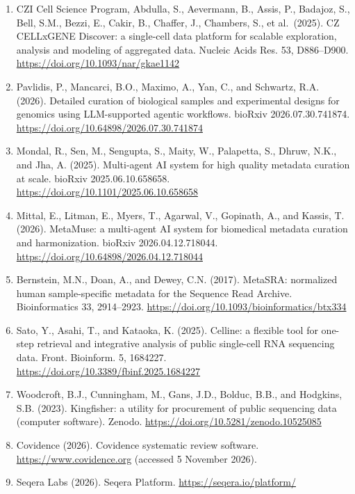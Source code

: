 \documentclass[11pt,a4paper]{article}
\begin{document}
\begin{enumerate}
  Model Context Protocol contributors (2026). The official Go SDK for
  Model Context Protocol servers and clients, version 1.8.0.
  \url{https://github.com/modelcontextprotocol/go-sdk} (accessed 6
  November 2026).
\item
  CZI Cell Science Program, Abdulla, S., Aevermann, B., Assis, P.,
  Badajoz, S., Bell, S.M., Bezzi, E., Cakir, B., Chaffer, J., Chambers,
  S., et al.~(2025). CZ CELLxGENE Discover: a single-cell data platform
  for scalable exploration, analysis and modeling of aggregated data.
  Nucleic Acids Res. 53, D886--D900.
  \url{https://doi.org/10.1093/nar/gkae1142}
\item
  Pavlidis, P., Mancarci, B.O., Maximo, A., Yan, C., and Schwartz, R.A.
  (2026). Detailed curation of biological samples and experimental
  designs for genomics using LLM-supported agentic workflows. bioRxiv
  2026.07.30.741874. \url{https://doi.org/10.64898/2026.07.30.741874}
\item
  Mondal, R., Sen, M., Sengupta, S., Maity, W., Palapetta, S., Dhruw,
  N.K., and Jha, A. (2025). Multi-agent AI system for high quality
  metadata curation at scale. bioRxiv 2025.06.10.658658.
  \url{https://doi.org/10.1101/2025.06.10.658658}
\item
  Mittal, E., Litman, E., Myers, T., Agarwal, V., Gopinath, A., and
  Kassis, T. (2026). MetaMuse: a multi-agent AI system for biomedical
  metadata curation and harmonization. bioRxiv 2026.04.12.718044.
  \url{https://doi.org/10.64898/2026.04.12.718044}
\item
  Bernstein, M.N., Doan, A., and Dewey, C.N. (2017). MetaSRA: normalized
  human sample-specific metadata for the Sequence Read Archive.
  Bioinformatics 33, 2914--2923.
  \url{https://doi.org/10.1093/bioinformatics/btx334}
\item
  Sato, Y., Asahi, T., and Kataoka, K. (2025). Celline: a flexible tool
  for one-step retrieval and integrative analysis of public single-cell
  RNA sequencing data. Front. Bioinform. 5, 1684227.
  \url{https://doi.org/10.3389/fbinf.2025.1684227}
\item
  Woodcroft, B.J., Cunningham, M., Gans, J.D., Bolduc, B.B., and
  Hodgkins, S.B. (2023). Kingfisher: a utility for procurement of public
  sequencing data (computer software). Zenodo.
  \url{https://doi.org/10.5281/zenodo.10525085}
\item
  Covidence (2026). Covidence systematic review software.
  \url{https://www.covidence.org} (accessed 5 November 2026).
\item
  Seqera Labs (2026). Seqera Platform. \url{https://seqera.io/platform/}

\end{enumerate}
\end{document}
